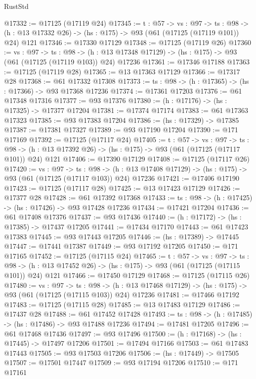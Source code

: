 \begin{lexlean}{RustStd}
\begin{coremodule}
@17332 := @17125 (@17119 @24)
@17345 := {t : @57} ->
  {vs : @97} ->
  {ts : @98} -> (h : @13 @17332 @26) -> (hs : @175) -> @93 (@61 (@17125 (@17119 @101)) @24) @121
@17346 := @17330 @17129
@17348 := @17125 (@17119 @26)
@17360 := {vs : @97} ->
  {ts : @98} ->
  (h : @13 @17348 @17129) -> (hs : @175) -> @93 (@61 (@17125 (@17119 @103)) @24) @17236
@17361 := @17346 @17188
@17363 := @17125 (@17119 @28)
@17365 := @13 @17363 @17129
@17366 := @17317 @28
@17368 := @61 @17332 @17308
@17373 := {ts : @98} -> (h : @17365) -> (hs : @17366) -> @93 @17368 @17236
@17374 := @17361 @17203
@17376 := @61 @17348 @17316
@17377 := @93 @17376
@17380 := (h : @17176) -> (hs : @17325) -> @17377 @17204
@17381 := @17374 @17174
@17383 := @61 @17363 @17323
@17385 := @93 @17383 @17204
@17386 := (hs : @17329) -> @17385
@17387 := @17381 @17327
@17389 := @93 @17190 @17204
@17390 := @171 @17169
@17392 := @17125 (@17117 @24)
@17405 := {t : @57} ->
  {vs : @97} ->
  {ts : @98} -> (h : @13 @17392 @26) -> (hs : @175) -> @93 (@61 (@17125 (@17117 @101)) @24) @121
@17406 := @17390 @17129
@17408 := @17125 (@17117 @26)
@17420 := {vs : @97} ->
  {ts : @98} ->
  (h : @13 @17408 @17129) -> (hs : @175) -> @93 (@61 (@17125 (@17117 @103)) @24) @17236
@17421 := @17406 @17190
@17423 := @17125 (@17117 @28)
@17425 := @13 @17423 @17129
@17426 := @17377 @28
@17428 := @61 @17392 @17368
@17433 := {ts : @98} -> (h : @17425) -> (hs : @17426) -> @93 @17428 @17236
@17434 := @17421 @17204
@17436 := @61 @17408 @17376
@17437 := @93 @17436
@17440 := (h : @17172) -> (hs : @17385) -> @17437 @17205
@17441 := @17434 @17170
@17443 := @61 @17423 @17383
@17445 := @93 @17443 @17205
@17446 := (hs : @17389) -> @17445
@17447 := @17441 @17387
@17449 := @93 @17192 @17205
@17450 := @171 @17165
@17452 := @17125 (@17115 @24)
@17465 := {t : @57} ->
  {vs : @97} ->
  {ts : @98} -> (h : @13 @17452 @26) -> (hs : @175) -> @93 (@61 (@17125 (@17115 @101)) @24) @121
@17466 := @17450 @17129
@17468 := @17125 (@17115 @26)
@17480 := {vs : @97} ->
  {ts : @98} ->
  (h : @13 @17468 @17129) -> (hs : @175) -> @93 (@61 (@17125 (@17115 @103)) @24) @17236
@17481 := @17466 @17192
@17483 := @17125 (@17115 @28)
@17485 := @13 @17483 @17129
@17486 := @17437 @28
@17488 := @61 @17452 @17428
@17493 := {ts : @98} -> (h : @17485) -> (hs : @17486) -> @93 @17488 @17236
@17494 := @17481 @17205
@17496 := @61 @17468 @17436
@17497 := @93 @17496
@17500 := (h : @17168) -> (hs : @17445) -> @17497 @17206
@17501 := @17494 @17166
@17503 := @61 @17483 @17443
@17505 := @93 @17503 @17206
@17506 := (hs : @17449) -> @17505
@17507 := @17501 @17447
@17509 := @93 @17194 @17206
@17510 := @171 @17161

\end{coremodule}
\end{lexlean}
